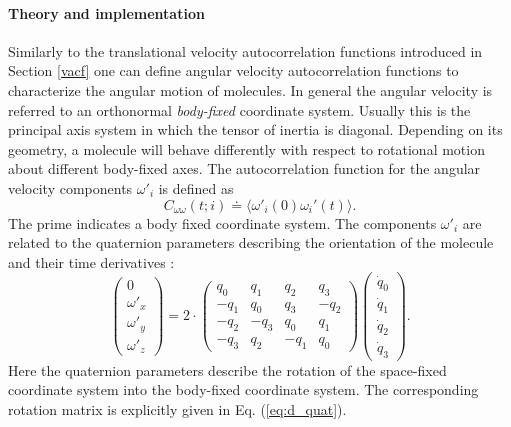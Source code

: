 \documentclass[a4paper,11pt]{report}
\begin{document}
\paragraph{Theory and implementation\\}
\label{avacf_theory}
Similarly to the translational velocity autocorrelation functions introduced in Section \ref{vacf} one can define angular 
velocity autocorrelation functions to characterize the angular motion of molecules. In general the angular velocity is 
referred to an orthonormal {\em body-fixed} coordinate system. Usually this is the principal axis system in which the tensor 
of inertia is diagonal. Depending on its geometry, a molecule will behave differently with respect to rotational motion 
about different body-fixed axes.  The autocorrelation function for the angular velocity components $\omega'_{i}$ is defined 
as
\begin{equation}
\label{eq:c_omgomg}
C_{\omega\omega}(t;i) \doteq
\langle\omega'_{i}(0)\omega_{i}'(t) \rangle.
\end{equation}
The prime indicates a body fixed coordinate system. The components $\omega'_{i}$ are related to the quaternion parameters
describing the orientation of the molecule and their time derivatives \cite{Smith:1992,Tildesley}:
\begin{equation}
\label{eq:omega_prime_quat_dot)}
\left(\begin{array}{c}
      0         \\
      \omega'_x \\
      \omega'_y \\
      \omega'_z 
      \end{array}
\right)      
      = 2 \cdot
\left(
\begin{array}{rrrr}
  q_0 & q_1 & q_2 & q_3 \\
 -q_1 & q_0 & q_3 &-q_2 \\
 -q_2 &-q_3 & q_0 & q_1 \\
 -q_3 & q_2 &-q_1 & q_0 
\end{array}
\right)
\left(\begin{array}{c}
      \dot q_0 \\
      \dot q_1 \\
      \dot q_2 \\
      \dot q_3 
      \end{array}
\right).
\end{equation}
Here the quaternion parameters describe the rotation of the space-fixed coordinate system into the body-fixed coordinate 
system. The corresponding rotation matrix is explicitly given in Eq. (\ref{eq:d_quat}).
\end{document}
